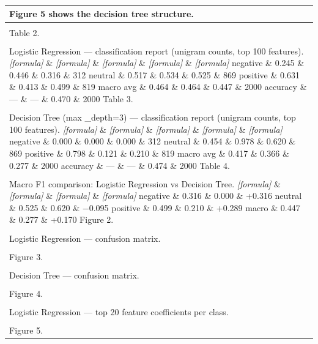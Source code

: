 \documentclass[11pt]{article}
\begin{document}
\begin{longtable}{|p{\dimexpr\linewidth-2\tabcolsep-2\arrayrulewidth\relax}|}
Figure 5 shows the decision tree structure. \\[2pt]
\hline
\rule{0pt}{3.5cm} \\
\hline
Table 2. \\[2pt]
\hline
\rule{0pt}{3.5cm} \\
\hline
Logistic Regression --- classification report (unigram counts, top 100 features). \textit{[formula]} \& \textit{[formula]} \& \textit{[formula]} \& \textit{[formula]} \& \textit{[formula]} negative \& 0.245 \& 0.446 \& 0.316 \& 312 neutral \& 0.517 \& 0.534 \& 0.525 \& 869 positive \& 0.631 \& 0.413 \& 0.499 \& 819 macro avg \& 0.464 \& 0.464 \& 0.447 \& 2000 accuracy \& --- \& --- \& 0.470 \& 2000 Table 3. \\[2pt]
\hline
\rule{0pt}{3.5cm} \\
\hline
Decision Tree (max \_depth=3) --- classification report (unigram counts, top 100 features). \textit{[formula]} \& \textit{[formula]} \& \textit{[formula]} \& \textit{[formula]} \& \textit{[formula]} negative \& 0.000 \& 0.000 \& 0.000 \& 312 neutral \& 0.454 \& 0.978 \& 0.620 \& 869 positive \& 0.798 \& 0.121 \& 0.210 \& 819 macro avg \& 0.417 \& 0.366 \& 0.277 \& 2000 accuracy \& --- \& --- \& 0.474 \& 2000 Table 4. \\[2pt]
\hline
\rule{0pt}{3.5cm} \\
\hline
Macro F1 comparison: Logistic Regression vs Decision Tree. \textit{[formula]} \& \textit{[formula]} \& \textit{[formula]} \& \textit{[formula]} negative \& 0.316 \& 0.000 \& +0.316 neutral \& 0.525 \& 0.620 \& −0.095 positive \& 0.499 \& 0.210 \& +0.289 macro \& 0.447 \& 0.277 \& +0.170 Figure 2. \\[2pt]
\hline
\rule{0pt}{3.5cm} \\
\hline
Logistic Regression --- confusion matrix. \\[2pt]
\hline
\rule{0pt}{3.5cm} \\
\hline
Figure 3. \\[2pt]
\hline
\rule{0pt}{3.5cm} \\
\hline
Decision Tree --- confusion matrix. \\[2pt]
\hline
\rule{0pt}{3.5cm} \\
\hline
Figure 4. \\[2pt]
\hline
\rule{0pt}{3.5cm} \\
\hline
Logistic Regression --- top 20 feature coefficients per class. \\[2pt]
\hline
\rule{0pt}{3.5cm} \\
\hline
Figure 5. \\[2pt]

\end{longtable}
\end{document}
